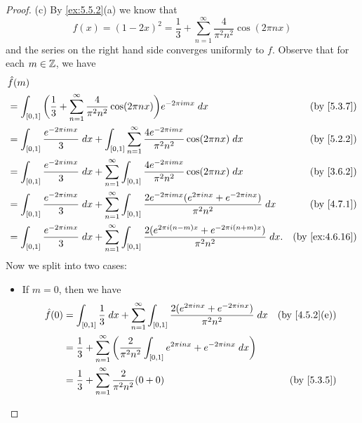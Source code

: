 \begin{proof}{(c)}
  By \cref{ex:5.5.2}(a) we know that
  \[
    f(x) = (1 - 2x)^2 = \frac{1}{3} + \sum_{n = 1}^\infty \frac{4}{\pi^2 n^2} \cos(2 \pi n x)
  \]
  and the series on the right hand side converges uniformly to \(f\).
  Observe that for each \(m \in \mathbb{Z}\), we have
  \begin{align*}
     & \hat{f}(m)                                                                                                                                                                                             \\
     & = \int_{[0, 1]} \bigg(\frac{1}{3} + \sum_{n = 1}^\infty \frac{4}{\pi^2 n^2} \cos(2 \pi n x)\bigg) e^{-2 \pi i m x} \; dx                                                & \text{(by \cref{5.3.7})}     \\
     & = \int_{[0, 1]} \frac{e^{- 2 \pi i m x}}{3} \; dx + \int_{[0, 1]} \sum_{n = 1}^\infty \frac{4 e^{- 2 \pi i m x}}{\pi^2 n^2} \cos(2 \pi n x) \; dx                       & \text{(by \cref{5.2.2})}     \\
     & = \int_{[0, 1]} \frac{e^{- 2 \pi i m x}}{3} \; dx + \sum_{n = 1}^\infty \int_{[0, 1]} \frac{4 e^{- 2 \pi i m x}}{\pi^2 n^2} \cos(2 \pi n x) \; dx                       & \text{(by \cref{3.6.2})}     \\
     & = \int_{[0, 1]} \frac{e^{- 2 \pi i m x}}{3} \; dx + \sum_{n = 1}^\infty \int_{[0, 1]} \frac{2 e^{- 2 \pi i m x} (e^{2 \pi i n x} + e^{- 2 \pi i n x})}{\pi^2 n^2} \; dx & \text{(by \cref{4.7.1})}     \\
     & = \int_{[0, 1]} \frac{e^{- 2 \pi i m x}}{3} \; dx + \sum_{n = 1}^\infty \int_{[0, 1]} \frac{2 (e^{2 \pi i (n - m) x} + e^{- 2 \pi i (n + m) x})}{\pi^2 n^2} \; dx.      & \text{(by \cref{ex:4.6.16})}
  \end{align*}
  Now we split into two cases:
  \begin{itemize}
    \item If \(m = 0\), then we have
          \begin{align*}
            \hat{f}(0) & = \int_{[0, 1]} \frac{1}{3} \; dx + \sum_{n = 1}^\infty \int_{[0, 1]} \frac{2 (e^{2 \pi i n x} + e^{- 2 \pi i n x})}{\pi^2 n^2} \; dx & \text{(by \cref{4.5.2}(e))} \\
                       & = \frac{1}{3} + \sum_{n = 1}^\infty \bigg(\frac{2}{\pi^2 n^2} \int_{[0, 1]} e^{2 \pi i n x} + e^{- 2 \pi i n x} \; dx\bigg)                                         \\
                       & = \frac{1}{3} + \sum_{n = 1}^\infty \frac{2}{\pi^2 n^2} (0 + 0)                                                                       & \text{(by \cref{5.3.5})}    \\

\end{align*}
\end{itemize}
\end{proof}
